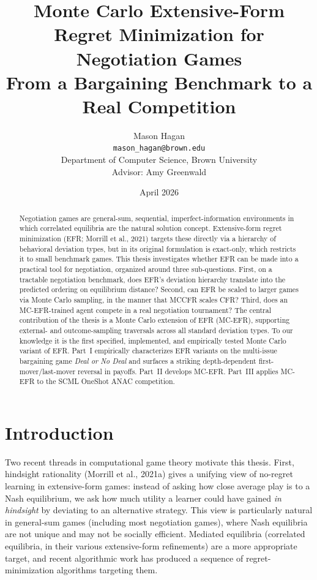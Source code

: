 \documentclass[11pt]{article}
\title{\bfseries Monte Carlo Extensive-Form Regret Minimization for Negotiation Games\\[0.3em]
       \large From a Bargaining Benchmark to a Real Competition}
\author{Mason Hagan\\\small \texttt{mason\_hagan@brown.edu}\\\small Department of Computer Science, Brown University\\\small Advisor: Amy Greenwald}
\date{April 2026}
\begin{document}
\maketitle

\begin{abstract}
Negotiation games are general-sum, sequential, imperfect-information environments in which correlated equilibria are the natural solution concept. Extensive-form regret minimization (EFR; Morrill et al., 2021) targets these directly via a hierarchy of behavioral deviation types, but in its original formulation is exact-only, which restricts it to small benchmark games. This thesis investigates whether EFR can be made into a practical tool for negotiation, organized around three sub-questions. First, on a tractable negotiation benchmark, does EFR's deviation hierarchy translate into the predicted ordering on equilibrium distance? Second, can EFR be scaled to larger games via Monte Carlo sampling, in the manner that MCCFR scales CFR? Third, does an MC-EFR-trained agent compete in a real negotiation tournament? The central contribution of the thesis is a Monte Carlo extension of EFR (MC-EFR), supporting external- and outcome-sampling traversals across all standard deviation types. To our knowledge it is the first specified, implemented, and empirically tested Monte Carlo variant of EFR. Part~I empirically characterizes EFR variants on the multi-issue bargaining game \emph{Deal or No Deal} and surfaces a striking depth-dependent first-mover/last-mover reversal in payoffs. Part~II develops MC-EFR. Part~III applies MC-EFR to the SCML OneShot ANAC competition.
\end{abstract}

\tableofcontents

\newpage

\section*{Introduction}
\label{sec:intro}

Two recent threads in computational game theory motivate this thesis. First, hindsight rationality (Morrill et al., 2021a) gives a unifying view of no-regret learning in extensive-form games: instead of asking how close average play is to a Nash equilibrium, we ask how much utility a learner could have gained \emph{in hindsight} by deviating to an alternative strategy. This view is particularly natural in general-sum games (including most negotiation games), where Nash equilibria are not unique and may not be socially efficient. Mediated equilibria (correlated equilibria, in their various extensive-form refinements) are a more appropriate target, and recent algorithmic work has produced a sequence of regret-minimization algorithms targeting them.
\end{document}

